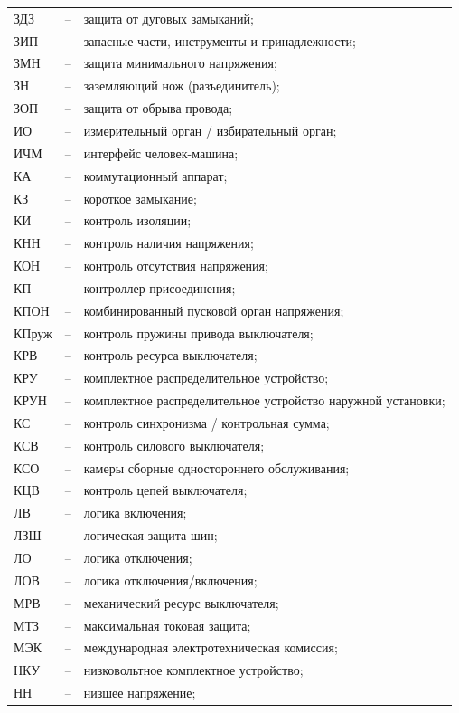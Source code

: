 \begin{longtable}{>{\raggedright\arraybackslash}m{2cm}>{\raggedright\arraybackslash}m{0.5cm}>{\raggedright\arraybackslash}m{20cm}}
ЗДЗ & -- & защита от дуговых замыканий; \\
ЗИП & -- & запасные части, инструменты и принадлежности; \\
ЗМН & -- & защита минимального напряжения; \\
ЗН & -- & заземляющий нож (разъединитель); \\
ЗОП & -- & защита от обрыва провода; \\
ИО & -- & измерительный орган / избирательный орган; \\
ИЧМ & -- & интерфейс человек-машина; \\
КА & -- & коммутационный аппарат; \\
КЗ & -- & короткое замыкание; \\
КИ & -- & контроль изоляции; \\
КНН & -- & контроль наличия напряжения; \\
КОН & -- & контроль отсутствия напряжения; \\
КП & -- & контроллер присоединения; \\
КПОН & -- & комбинированный пусковой орган напряжения; \\
КПруж & -- & контроль пружины привода выключателя; \\
КРВ & -- & контроль ресурса выключателя; \\
КРУ & -- & комплектное распределительное устройство; \\
КРУН & -- & комплектное распределительное устройство наружной установки; \\
КС & -- & контроль синхронизма / контрольная сумма; \\
КСВ & -- & контроль силового выключателя; \\
КСО & -- & камеры сборные одностороннего обслуживания; \\
КЦВ & -- & контроль цепей выключателя; \\
ЛВ & -- & логика включения; \\
ЛЗШ & -- & логическая защита шин; \\
ЛО & -- & логика отключения; \\
ЛОВ & -- & логика отключения/включения; \\
МРВ & -- & механический ресурс выключателя; \\
МТЗ & -- & максимальная токовая защита; \\
МЭК & -- & международная электротехническая комиссия; \\
НКУ & -- & низковольтное комплектное устройство; \\
НН & -- & низшее напряжение; \\

\end{longtable}
